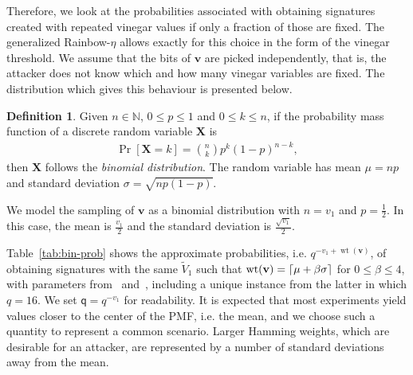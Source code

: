 \documentclass[12pt, a4paper, oneside]{memoir}
\DeclareMathOperator*{\wt}{wt}
\DeclarePairedDelimiter{\ceil}{\lceil}{\rceil}
\theoremstyle{definition}
\newtheorem{definition}[theorem]{Definition}
\begin{document}
Therefore, we look at the probabilities associated with obtaining signatures created with repeated vinegar values if only a fraction of those are fixed. The generalized Rainbow-$\eta$ allows exactly for this choice in the form of the vinegar threshold. We assume that the bits of $\mathbf{v}$ are picked independently, that is, the attacker does not know which and how many vinegar variables are fixed. The distribution which gives this behaviour is presented below.
\begin{definition}
  Given $n \in \mathbb{N}$, $0 \leq p \leq 1$ and $0 \leq k \leq n$, if the probability mass function of a discrete random variable $\mathbf{X}$ is
  \begin{align*}
    \Pr[\mathbf{X} = k] = \binom{n}{k} p^{k} (1 - p)^{n - k},
  \end{align*}
  then $\mathbf{X}$ follows the \emph{binomial distribution}. The random variable has mean $\mu = np$ and standard deviation $\sigma = \sqrt{np(1 - p)}$.
\end{definition}
We model the sampling of $\mathbf{v}$ as a binomial distribution with $n = v_{1}$ and $p = \frac{1}{2}$. In this case, the mean is $\frac{v_{1}}{2}$ and the standard deviation is $\frac{\sqrt{v_{1}}}{2}$.

Table~\ref{tab:bin-prob} shows the approximate probabilities, i.e. $q^{-v_{1} + \wt(\mathbf{v})}$, of obtaining signatures with the same $\widetilde{V}_{1}$ such that $\wt(\mathbf{v}) = \ceil{\mu + \beta \sigma}$ for $0 \leq \beta \leq 4$, with parameters from~\cite[Tab.~9.8]{Petzoldt:201307} and~\cite[Sec.~4]{Ding:202006}, including a unique instance from the latter in which $q = 16$. We set $\mathsf{q} = q^{-v_{1}}$ for readability. It is expected that most experiments yield values closer to the center of the PMF, i.e. the mean, and we choose such a quantity to represent a common scenario. Larger Hamming weights, which are desirable for an attacker, are represented by a number of standard deviations away from the mean.
\end{document}

